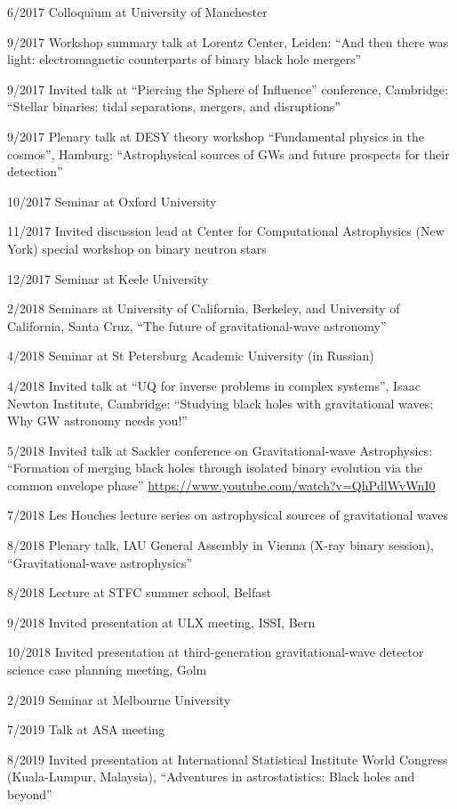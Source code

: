 \documentclass[margin,line]{res}
\begin{document}
\begin{resume}
6/2017 	Colloquium at University of Manchester

9/2017	Workshop summary talk at Lorentz Center, Leiden: ``And then there was light: electromagnetic counterparts of binary black hole mergers''

9/2017	Invited talk at ``Piercing the Sphere of Influence'' conference, Cambridge: ``Stellar binaries: tidal separations, mergers, and disruptions''

9/2017	Plenary talk at DESY theory workshop ``Fundamental physics in the cosmos'', Hamburg: ``Astrophysical sources of GWs and future prospects for their detection''

10/2017	Seminar at Oxford University

11/2017 	Invited discussion lead at Center for Computational Astrophysics (New York) special workshop on binary neutron stars

12/2017 	Seminar at Keele University

2/2018  	Seminars at University of California, Berkeley, and University of California, Santa Cruz, ``The future of gravitational-wave astronomy''

4/2018	Seminar at St Petersburg Academic University (in Russian)

4/2018	Invited talk at ``UQ for inverse problems in complex systems'', Isaac Newton Institute, Cambridge: ``Studying black holes with gravitational waves: Why GW astronomy needs you!''

5/2018 Invited talk at Sackler conference on Gravitational-wave Astrophysics: ``Formation of merging black holes through isolated binary evolution via the common envelope phase'' \url{https://www.youtube.com/watch?v=QhPdlWvWnI0}

7/2018 Les Houches lecture series on astrophysical sources of gravitational waves

8/2018 Plenary talk, IAU General Assembly in Vienna (X-ray binary session), ``Gravitational-wave astrophysics''

8/2018 Lecture at STFC summer school, Belfast

9/2018 Invited presentation at ULX meeting, ISSI, Bern

10/2018 Invited presentation at third-generation gravitational-wave detector science case planning meeting, Golm

2/2019 Seminar at Melbourne University

7/2019 Talk at ASA meeting

8/2019 Invited presentation at International Statistical Institute World Congress (Kuala-Lumpur, Malaysia), ``Adventures in astrostatistics: Black holes and beyond''


\end{resume}
\end{document}
